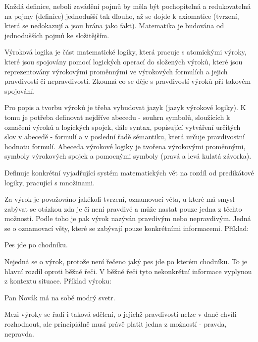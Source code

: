 Každá definice, neboli zavádění pojmů by měla být pochopitelná a redukovatelná na pojmy (definice) jednodušší tak dlouho, až se dojde k axiomatice (tvrzení, která se nedokazují a jsou brána jako fakt). Matematika je budována od jednodušších pojmů ke složitějším.


Výroková logika je část matematické logiky, která pracuje s atomickými výroky, které jsou spojovány pomocí logických operací do složených výroků, které jsou reprezentovány výrokovými proměnnými ve výrokových formulích a jejich pravdivostí či nepravdivostí. Zkoumá co se děje s pravdivostí výroků při takovém spojování.

Pro popis a tvorbu výroků je třeba vybudovat jazyk (jazyk výrokové logiky). K tomu je potřeba definovat nejdříve abecedu - souhrn symbolů, sloužících k označení výroků a logických spojek, dále syntax, popisující vytváření určitých slov v abecedě - formulí a v poslední řadě sémantiku, která určuje pravdivostní  hodnotu formulí. Abeceda výrokové logiky je tvořena výrokovými proměnnými, symboly výrokových spojek a pomocnými symboly (pravá a levá kulatá závorka).

Definuje konkrétní vyjadřující systém matematických vět na rozdíl od predikátové logiky, pracující s množinami.


Za výrok je považováno jakékoli tvrzení, oznamovací věta, u které má smysl zabývat se otázkou zda je či není pravdivé a může nastat pouze jedna z těchto možností. Podle toho je pak výrok nazýván pravdivým nebo nepravdivým. Jedná se o oznamovací věty, které se zabývají pouze konkrétními informacemi. Příklad:

\vskip 4mm
{\verbatim Pes jde po chodníku.}
\vskip 4mm

Nejedná se o výrok, protože není řečeno jaký pes jde po kterém chodníku. To je hlavní rozdíl oproti běžné řeči. V běžné řeči tyto nekonkrétní informace vyplynou z kontextu situace. Příklad výroku:

\vskip 4mm
{\verbatim Pan Novák má na sobě modrý svetr.}
\vskip 4mm

Mezi výroky se řadí i taková sdělení, o jejichž pravdivosti nelze v dané chvíli rozhodnout, ale principiálně musí právě platit jedna z možností - pravda, nepravda.


